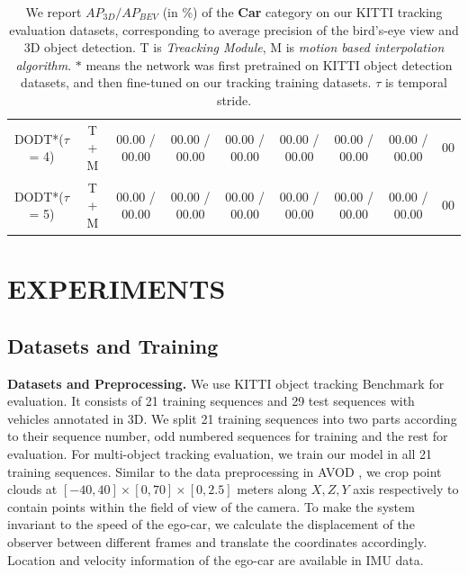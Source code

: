 \documentclass[letterpaper, 10 pt, conference]{ieeeconf}  %
\begin{document}
\begin{table}
{\begin{tabular}{ccccccccc}
			\multicolumn{1}{c|}{DODT*($\tau$ = 4)}     &\multicolumn{1}{c|}{T + M} & 00.00 / 00.00  & 00.00 / 00.00 & \multicolumn{1}{c|}{00.00 / 00.00}  & 00.00 / 00.00 & 00.00 / 00.00 & \multicolumn{1}{c|}{00.00 / 00.00}   & 00\\
			\multicolumn{1}{c|}{DODT*($\tau$ = 5)}     &\multicolumn{1}{c|}{T + M} & 00.00 / 00.00  & 00.00 / 00.00 & \multicolumn{1}{c|}{00.00 / 00.00}  & 00.00 / 00.00 & 00.00 / 00.00 & \multicolumn{1}{c|}{00.00 / 00.00}   & 00\\\midrule
		\end{tabular}}
	\caption{We report $AP_{3D}/AP_{BEV}$ (in \%) of the \textbf{Car} category on our KITTI tracking evaluation datasets, 
		corresponding to average precision of the bird’s-eye view and 3D object detection. T is \textit{Treacking Module}, M is \textit{motion based interpolation algorithm}. 
		 $*$ means the network was first pretrained on KITTI object detection datasets, and then fine-tuned on our tracking training datasets. $\tau$ is temporal stride.} 
	\label{table:result_detection}
	\vspace{-0.4cm}
\end{table}

\section{EXPERIMENTS}
\subsection{Datasets and Training}

\textbf{Datasets and Preprocessing.} We use KITTI object tracking Benchmark \cite{geiger2013vision} for evaluation. It consists of 21 training sequences and 29 test sequences with vehicles annotated in 3D. We split 21 training sequences into two parts according to their sequence number, odd numbered sequences for training and the rest for evaluation. For multi-object tracking evaluation, we train our model in all 21 training sequences. Similar to the data preprocessing in AVOD \cite{ku2018joint}, we crop point clouds at $[-40, 40] \times [0, 70] \times [0, 2.5]$ meters along $X, Z, Y$ axis respectively to contain points within the field of view of the camera. To make the system invariant to the speed of the ego-car, we calculate the displacement of the observer between different frames and translate the coordinates accordingly. Location and velocity information of the ego-car are available in IMU data.
\end{document}
